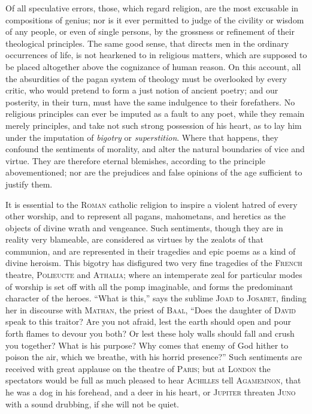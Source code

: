 Of all speculative errors, those, which regard religion, are the most
excusable in compositions of genius; nor is it ever permitted to judge
of the civility or wisdom of any people, or even of single persons, by
the grossness or refinement of their theological principles. The same
good sense, that directs men in the ordinary occurrences of life, is
not hearkened to in religious matters, which are supposed to be placed
altogether above the cognizance of human reason. On this account, all
the absurdities of the pagan system of theology must be overlooked by
every critic, who would pretend to form a just notion of ancient
poetry; and our posterity, in their turn, must have the same
indulgence to their forefathers. No religious principles can ever be
imputed as a fault to any poet, while they remain merely principles,
and take not such strong possession of his heart, as to lay him under
the imputation of \textit{bigotry} or \textit{superstition}. Where
that happens, they confound the sentiments of morality, and alter
 the natural boundaries of vice and virtue. They are
therefore eternal blemishes, according to the principle
abovementioned; nor are the prejudices and false opinions of the age
sufficient to justify them.

It is essential to the \textsc{Roman} catholic religion to inspire a
violent hatred of every other worship, and to represent all pagans,
mahometans, and heretics as the objects of divine wrath and vengeance.
Such sentiments, though they are in reality very blameable, are
considered as virtues by the zealots of that communion, and are
represented in their tragedies and epic poems as a kind of divine
heroism. This bigotry has disfigured two very fine tragedies of the
\textsc{French} theatre, \textsc{Polieucte} and \textsc{Athalia};
where an intemperate zeal for particular modes of worship is set off
with all the pomp imaginable, and forms the predominant character of
the heroes. ``What is this,'' says the sublime \textsc{Joad} to
\textsc{Josabet}, finding her in discourse with \textsc{Mathan}, the
priest of \textsc{Baal}, ``Does the daughter of \textsc{David} speak
to this traitor? Are you not afraid, lest the earth should open and
pour forth flames to devour you both? Or lest these holy walls should
fall and crush you together? What is his purpose? Why comes that enemy
of God hither to poison the air, which we breathe, with his horrid
presence?'' Such sentiments are received with great applause on the
theatre of \textsc{Paris}; but at \textsc{London} the spectators would
be full as much pleased to hear \textsc{Achilles} tell
\textsc{Agamemnon}, that he was a dog in his forehead, and a deer in
his heart, or \textsc{Jupiter} threaten \textsc{Juno} with a sound
drubbing, if she will not be quiet.

